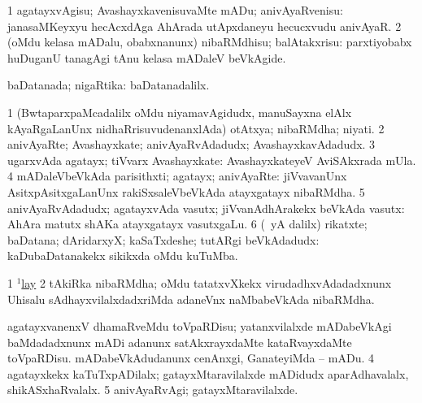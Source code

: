 \bentry
{}
\gl{\sakirx}
\bmng
\bnum
\num{1} agatayxvAgisu; AvashayxkavenisuvaMte mADu; anivAyaRvenisu:  janasaMKeyxyu hecAcxdAga AhArada utApxdaneyu hecucxvudu anivAyaR. 
\num{2} (oMdu kelasa mADalu, obabxnanunx) nibaRMdhisu; balAtakxrisu:  parxtiyobabx huDuganU tanagAgi tAnu kelasa mADaleV beVkAgide. 
\enum
\emng
\eentry

\bentry
{}
\gl{\gu}
\bmng
baDatanada; nigaRtika:  baDatanadalilx. 
\emng
\eentry

\bentry
{}
\gl{\nA}
\bmng
\bnum
\num{1} (BwtaparxpaMcadalilx oMdu niyamavAgidudx, manuSayxna elAlx kAyaRgaLanUnx nidhaRrisuvudenanxlAda) otAtxya; nibaRMdha; niyati. 
\num{2} anivAyaRte; Avashayxkate; anivAyaRvAdadudx; AvashayxkavAdadudx. 
\num{3} ugarxvAda agatayx; tiVvarx Avashayxkate:  AvashayxkateyeV AviSAkxrada mUla. 
\num{4} mADaleVbeVkAda parisithxti; agatayx; anivAyaRte:  jiVvavanUnx AsitxpAsitxgaLanUnx rakiSxsaleVbeVkAda atayxgatayx nibaRMdha. 
\num{5} anivAyaRvAdadudx; agatayxvAda vasutx; jiVvanAdhArakekx beVkAda vasutx:  AhAra matutx shAKa atayxgatayx vasutxgaLu. 
\num{6} (\Eva\ yA \bava dalilx) rikatxte; baDatana; dAridarxyX; kaSaTxdeshe; tutARgi beVkAdadudx:  kaDubaDatanakekx sikikxda oMdu kuTuMba. 
\enum
\emng

\noindent
\gl{\pagu}
\bmng
\bnum
\num{1} \hyperref{kandict_l.pdf}{L}{lay(1) nuga(23)}{$^1$lay}  
\num{2}  tAkiRka nibaRMdha; oMdu tatatxvXkekx virudadhxvAdadadxnunx Uhisalu sAdhayxvilalxdadxriMda adaneVnx naMbabeVkAda nibaRMdha. 
  
\banum
{} agatayxvanenxV dhamaRveMdu toVpaRDisu; yatanxvilalxde mADabeVkAgi baMdadadxnunx mADi adanunx satAkxrayxdaMte kataRvayxdaMte toVpaRDisu. 
 mADabeVkAdudanunx cenAnxgi, GanateyiMda -- mADu. 
\eanum
\numie
\num{4}  agatayxkekx kaTuTxpADilalx; gatayxMtaravilalxde mADidudx aparAdhavalalx, shikASxhaRvalalx. 
\num{5}  anivAyaRvAgi; gatayxMtaravilalxde. 
\enum
\emng
\eentry

